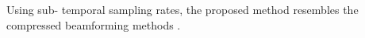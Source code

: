Using
sub- temporal sampling rates,
the proposed method resembles
the compressed beamforming methods
\cite{article:ChernyakovaITUFFC2018,proc:SchiffnerIUS2016a,article:BurshteinITUFFC2016,article:ChernyakovaITUFFC2014,article:WagnerITSP2012}.
